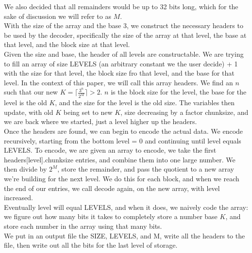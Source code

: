 \documentclass{article}
\begin{document}
We also decided that all remainders would be up to 32 bits long, which for the sake of discussion we will refer to as $M$.\\

With the size of the array and the base 3, we construct the necessary headers to be used by the decoder, specifically the size of the array at that level, the base at that level, and the block size at that level. \\

Given the size and base, the header of all levels are constructable. We are trying to fill an array of size LEVELS (an arbitrary constant we the user decide) + 1 with the size for that level, the block size fro that level, and the base for that level. In the context of this paper, we will call this array headers. We find an $n$ such that our new $K = \lceil \frac{3^n}{2^M} \rceil > 2$. $n$ is the block size for the level, the base for the level is the old $K$, and the size for the level is the old size. The variables then update, with old $K$ being set to new $K$, size decreasing by a factor chunksize, and we are back where we started, just a level higher up the headers.\\

Once the headers are found, we can begin to encode the actual data. We encode recursively, starting from the bottom level = 0 and continuing until level equals LEVELS. To encode, we are given an array to encode, we take the first headers[level].chunksize entries, and combine them into one large number. We then divide by $2^M$, store the remainder, and pass the quotient to a new array we're building for the next level. We do this for each block, and when we reach the end of our entries, we call decode again, on the new array, with level increased.\\

Eventually level will equal LEVELS, and when it does, we naively code the array: we figure out how many bits it takes to completely store a number base $K$, and store each number in the array using that many bits. \\

We put in an output file the SIZE, LEVELS, and M, write all the headers to the file, then write out all the bits for the last level of storage. \\
\end{document}
